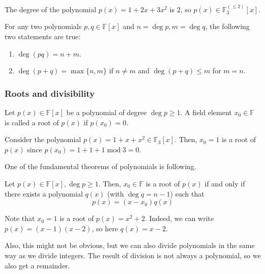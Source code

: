 \documentclass[../lecture-notes.tex]{subfiles}
\begin{document}
\begin{example}
    The degree of the polynomial $p(x) = 1 + 2x + 3x^2$ is $2$, so $p(x) \in \mathbb{F}_3^{(\leq 2)}[x]$.
\end{example}

\begin{theorem}
    For any two polynomials $p,q \in \mathbb{F}[x]$ and $n = \deg p, m = \deg q$, the following two statements are true:
    \begin{enumerate}
        \item $\deg (pq) = n + m$.
        \item $\deg (p + q) = \max\{n,m\}$ if $n \neq m$ and $\deg (p+q) \leq m$ for $m=n$.
    \end{enumerate}
\end{theorem}

\subsubsection{Roots and divisibility}

\begin{definition}
    Let $p(x) \in \mathbb{F}[x]$ be a polynomial of degree $\deg p \geq 1$. A field element $x_0 \in \mathbb{F}$ is called a root of $p(x)$ if $p(x_0) = 0$.
\end{definition}

\begin{example}
    Consider the polynomial $p(x) = 1 + x + x^2 \in \mathbb{F}_3[x]$. Then, $x_0=1$ is a root of $p(x)$ since $p(x_0) = 1 + 1 + 1 \; \text{mod} \; 3 = 0$.
\end{example}

One of the fundamental theorems of polynomials is following.

\begin{theorem}
    Let $p(x) \in \mathbb{F}[x], \deg p \geq 1$. Then, $x_0 \in \mathbb{F}$ is a root of $p(x)$ if and only if there exists a polynomial $q(x)$ (with $\deg q = n-1$) such that
    \begin{equation}
        p(x) = (x-x_0)q(x)
    \end{equation}
\end{theorem}

\begin{example}
    Note that $x_0=1$ is a root of $p(x) = x^2+2$. Indeed, we can write $p(x) = (x-1)(x-2)$, so here $q(x) = x-2$.
\end{example}

Also, this might not be obvious, but we can also divide polynomials in the same way as we divide integers. The result of division is not always a polynomial, so we also get a remainder.
\end{document}
